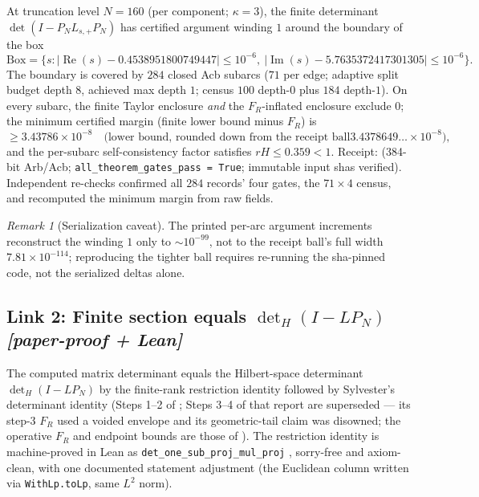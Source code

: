 \documentclass[11pt]{article}
\theoremstyle{definition}
\theoremstyle{remark}
\newtheorem{remark}[theorem]{Remark}
\renewcommand{\Re}{\operatorname{Re}}
\renewcommand{\Im}{\operatorname{Im}}
\newcommand{\detH}{\det\nolimits_{H}}
\begin{document}
At truncation level $N = 160$ (per component; $\kappa = 3$), the finite
determinant $\det(I - P_N L_{s,+} P_N)$ has certified argument winding
$1$ around the boundary of the box
\[
\mathrm{Box} = \{ s : |\Re(s) - 0.4538951800749447| \le 10^{-6},\
|\Im(s) - 5.7635372417301305| \le 10^{-6} \}.
\]
The boundary is covered by $284$ closed Acb subarcs ($71$ per edge;
adaptive split budget depth $8$, achieved max depth $1$; census $100$
depth-$0$ plus $184$ depth-$1$). On every subarc, the finite Taylor
enclosure \emph{and} the $F_R$-inflated enclosure exclude $0$; the
minimum certified margin (finite lower bound minus $F_R$) is
\begin{equation}
\label{eq:margin}
\ge 3.43786\times 10^{-8}
\quad\text{(lower bound, rounded down from the receipt ball
$3.4378649\ldots\times 10^{-8}$),}
\end{equation}
and the per-subarc self-consistency factor satisfies
$rH \le 0.359 < 1$. Receipt: \cite{R3bReceipt} (384-bit Arb/Acb;
\texttt{all\_theorem\_gates\_pass = True}; immutable input shas
verified). Independent re-checks confirmed all $284$ records' four
gates, the $71\times 4$ census, and recomputed the minimum margin from
raw fields.

\begin{remark}[Serialization caveat]
The printed per-arc argument increments reconstruct the winding $1$
only to $\sim 10^{-99}$, not to the receipt ball's full width
$7.81\times 10^{-114}$; reproducing the tighter ball requires re-running
the sha-pinned code, not the serialized deltas alone.
\end{remark}

\subsection*{Link 2: Finite section equals $\det_H(I - L P_N)$
\emph{[paper-proof + Lean]}}

The computed matrix determinant equals the Hilbert-space determinant
$\detH(I - L P_N)$ by the finite-rank restriction identity followed by
Sylvester's determinant identity (Steps 1--2 of \cite{R1Restatement};
Steps 3--4 of that report are superseded --- its step-3 $F_R$ used a
voided envelope and its geometric-tail claim was disowned; the
operative $F_R$ and endpoint bounds are those of \cite{R3bReport}).
The restriction identity is machine-proved in Lean as
\texttt{det\_one\_sub\_proj\_mul\_proj} \cite{LeanV18}, sorry-free and
axiom-clean, with one documented statement adjustment (the Euclidean
column written via \texttt{WithLp.toLp}, same $L^2$ norm).
\end{document}
